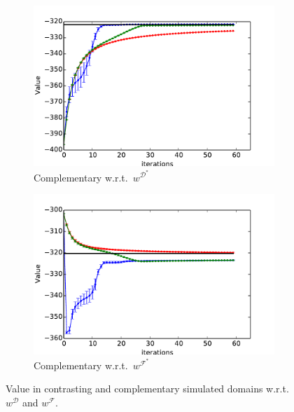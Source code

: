 \documentclass[letterpaper]{article}
\begin{document}
\begin{figure}[t]
\begin{subfigure}[b]{0.52\columnwidth}
    \includegraphics[trim=0.5cm 0.5cm 0.5cm 0,clip=true,width=\textwidth]{images/expert_apprentice_complementary.pdf}
    \caption{Complementary w.r.t.\ $w^{\mathcal{D}^*}$}
    \label{fig:toy_expert_apprentice_complementary}
  \end{subfigure}
  \hfill
  \begin{subfigure}[b]{0.52\columnwidth}
    \includegraphics[trim=0.5cm 0.5cm 0.5cm 0,clip=true,width=\textwidth]{images/taboo_apprentice_complementary.pdf}
    \caption{Complementary w.r.t.\ $w^{\mathcal{F}^*}$}
    \label{fig:toy_taboo_apprentice_complementary}
  \end{subfigure}  
  \caption{Value in contrasting and complementary simulated domains w.r.t.\ $w^\mathcal{D}$ and $w^\mathcal{F}$. }
  \vspace{-4mm}
  \label{fig:complementary}
\end{figure}
\end{document}
